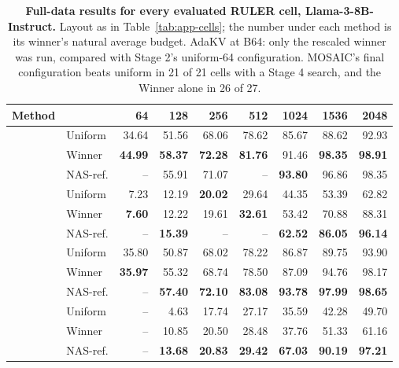 \begin{table}[t]
  \centering
  \footnotesize
  \setlength{\tabcolsep}{14pt}
  \renewcommand{\arraystretch}{1.0}
\begin{tabular}{@{} c l rrrrrrr @{}}
  \toprule
  \textbf{Method} & & \textbf{64} & \textbf{128} & \textbf{256} & \textbf{512} & \textbf{1024} & \textbf{1536} & \textbf{2048} \\
  \midrule
   & Uniform & 34.64 & 51.56 & 68.06 & 78.62 & 85.67 & 88.62 & 92.93 \\
   & Winner & \textbf{44.99} & \textbf{58.37} & \textbf{72.28} & \textbf{81.76} & 91.46 & \textbf{98.35} & \textbf{98.91} \\
   & NAS-ref. & -- & 55.91 & 71.07 & -- & \textbf{93.80} & 96.86 & 98.35 \\
  \midrule
   & Uniform & 7.23 & 12.19 & \textbf{20.02} & 29.64 & 44.35 & 53.39 & 62.82 \\
   & Winner & \textbf{7.60} & 12.22 & 19.61 & \textbf{32.61} & 53.42 & 70.88 & 88.31 \\
   & NAS-ref. & -- & \textbf{15.39} & -- & -- & \textbf{62.52} & \textbf{86.05} & \textbf{96.14} \\
  \midrule
   & Uniform & 35.80 & 50.87 & 68.02 & 78.22 & 86.87 & 89.75 & 93.90 \\
   & Winner & \textbf{35.97} & 55.32 & 68.74 & 78.50 & 87.09 & 94.76 & 98.17 \\
   & NAS-ref. & -- & \textbf{57.40} & \textbf{72.10} & \textbf{83.08} & \textbf{93.78} & \textbf{97.99} & \textbf{98.65} \\
  \midrule
   & Uniform & -- & 4.63 & 17.74 & 27.17 & 35.59 & 42.28 & 49.70 \\
   & Winner & -- & 10.85 & 20.50 & 28.48 & 37.76 & 51.33 & 61.16 \\
   & NAS-ref. & -- & \textbf{13.68} & \textbf{20.83} & \textbf{29.42} & \textbf{67.03} & \textbf{90.19} & \textbf{97.21} \\
  \bottomrule
\end{tabular}
  \caption{\textbf{Full-data results for every evaluated RULER cell, Llama-3-8B-Instruct.} Layout as in Table~\ref{tab:app-cells}; the number under each method is its winner's natural average budget. AdaKV at B64: only the rescaled winner was run, compared with Stage 2's uniform-64 configuration. MOSAIC's final configuration beats uniform in 21 of 21 cells with a Stage 4 search, and the Winner alone in 26 of 27.}
  \label{tab:app-cells-ruler}
\end{table}

